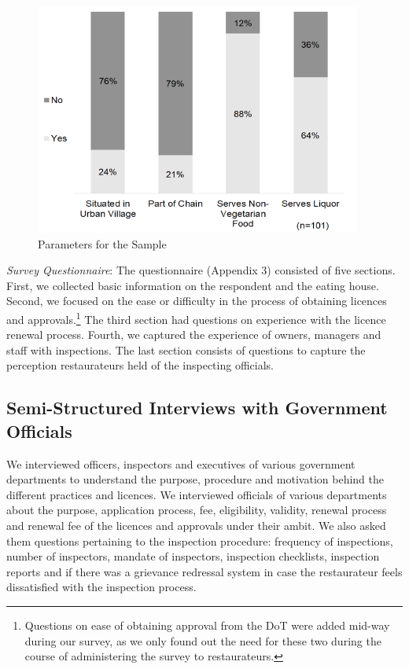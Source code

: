 \documentclass[a4paper, 12pt, twoside]{article}
\begin{document}
		\begin{figure}[H]
                    	\centering
                    	\includegraphics[height = 3in]{Figure9.png}
                    	\captionsetup{justification=centering}\caption[Optional Caption]{Parameters for the Sample}%
		\end{figure}

		\textit{Survey Questionnaire}: The questionnaire (Appendix 3) consisted of five sections. First, we collected basic information on the respondent and the eating house. Second, we focused on the ease or difficulty in the process of obtaining licences and 
approvals.\footnote{Questions on ease of obtaining approval from the DoT were added mid-way during our survey, as we only found out the need for these two during the course of administering the survey to restaurateurs.} The third section had questions on 
experience with the licence renewal process. Fourth, we captured the experience of owners, managers and staff with inspections. The last section consists of questions to capture the perception restaurateurs held of the inspecting officials.

		\subsection*{Semi-Structured Interviews with Government Officials}
		We interviewed officers, inspectors and executives of various government departments to understand the purpose, procedure and motivation behind the different practices and licences. We interviewed officials of various departments about the purpose, 
application process, fee, eligibility, validity, renewal process and renewal fee of the licences and approvals under their ambit. We also asked them questions pertaining to the inspection procedure: frequency of inspections, number of inspectors, mandate of 
inspectors, inspection checklists, inspection reports and if there was a grievance redressal system in case the restaurateur feels dissatisfied with the inspection process.
		
\end{document}
